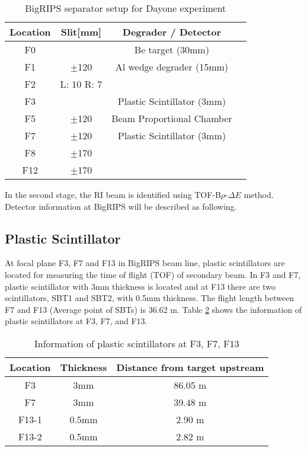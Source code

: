     \begin{table}[h]
        \centering
        \begin{tabular}{c c c c}
            \hline
            Location  & Slit[mm] & Degrader / Detector \\
            \hline
            F0  &  & Be target (30mm) \\
            F1  & $\pm$120 & Al wedge degrader (15mm)\\
            F2  & L: 10 R: 7 & \\
            F3   & & Plastic Scintillator (3mm)\\
            F5 & $\pm$120 & Beam Proportional Chamber \\
            F7  & $\pm$120 & Plastic Scintillator (3mm)\\
            F8  &$\pm$170 & \\
            F12 & $\pm$170 & \\
            \hline
        \end{tabular}
        \caption{BigRIPS separator setup for Dayone experiment \cite{Dayonewiki}}
        \label{tab:BigRIPS}
    \end{table}
In the second stage, the RI beam is identified using TOF-B$\rho$-$\Delta E$ method. Detector information at BigRIPS will be described as following.

\subsection{Plastic Scintillator}
At focal plane F3, F7 and F13 in BigRIPS beam line, plastic scintillators are located for measuring the time of flight (TOF) of secondary beam. In F3 and F7, plastic scintillator with 3mm thickness is located and at F13 there are two scintillators, SBT1 and SBT2, with 0.5mm thickness. The flight length between F7 and F13 (Average point of SBTs) is 36.62 m. Table \ref{tab:Plastic_Scintillator} shows the information of plastic scintillators at F3, F7, and F13.

\begin{table}[h]
    \centering
    \begin{tabular}{c|cc}
        \hline
        Location & Thickness & Distance from target upstream \\
        \hline
        F3 & 3mm & 86.05 m\\
        F7 & 3mm & 39.48 m\\
        F13-1 &0.5mm & 2.90 m\\
        F13-2 &0.5mm & 2.82 m\\
        \hline
    \end{tabular}
    \caption{Information of plastic scintillators at F3, F7, F13}
    \label{tab:Plastic_Scintillator}
\end{table}

